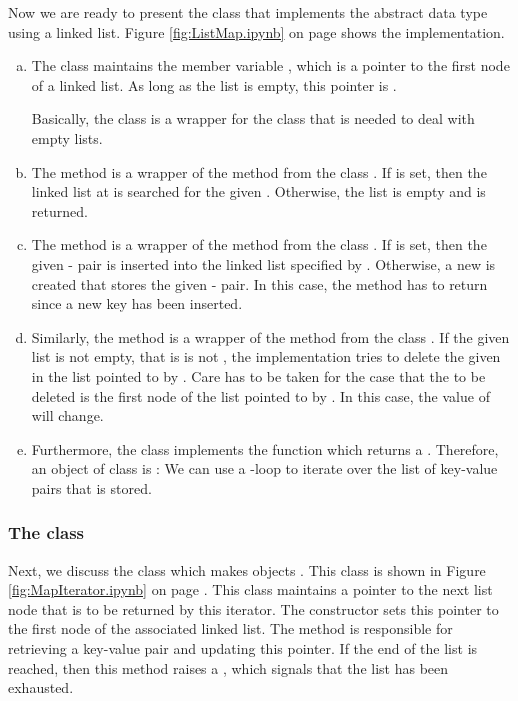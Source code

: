 Now we are ready to present the class  that implements the abstract data type  using a
linked list.  Figure \ref{fig:ListMap.ipynb} on page \pageref{fig:ListMap.ipynb} shows the implementation.
\begin{enumerate}[(a)]
\item The class maintains the  member variable , which is a pointer to the first node of a linked
      list.  As long as the list is empty, this pointer is .

      Basically, the class  is a wrapper for the class  that is needed to deal
      with empty lists.
\item The method  is a wrapper of the method  from the class .
      If  is set, then the linked list at  is searched for the given .
      Otherwise, the list is empty and  is returned.
\item The method  is a wrapper of the method  from the class .
      If  is set, then the given - pair is inserted into the
      linked list specified by .
      Otherwise, a new  is created that stores the given  - pair.
      In this case, the method has to return  since a new key has been inserted.
\item Similarly, the method  is a wrapper of the method  from the class
      .  If the given list is not empty, that is  is not ,
      the implementation tries to delete the given  in the list pointed to by .
      Care has to be taken for the case that the  to be deleted is the first node of the
      list pointed to by .  In this case, the value of  will change.
\item Furthermore, the class implements the function  which returns a
      .  Therefore, an object of class  is : We can
      use a -loop to iterate over the list of key-value pairs that is stored.  
\end{enumerate}
    
\subsubsection{The class }
Next, we discuss the class  which makes  objects .
This class is shown in Figure \ref{fig:MapIterator.ipynb} on page \pageref{fig:MapIterator.ipynb}.
This class maintains a pointer to the next list node that is to be returned by this iterator.
The constructor sets this pointer to the first node of the associated linked list.
The method  is responsible for retrieving a key-value pair and updating this pointer.
If the end of the list is reached, then this method raises a , which signals that the
list has been exhausted.

